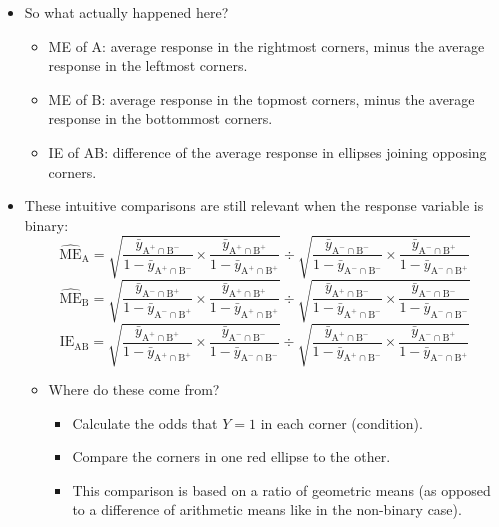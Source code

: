 \begin{itemize}
    \item So what actually happened here?
          \begin{itemize}
              \item ME of A\@: average response in the rightmost corners, minus the average response in the leftmost corners.
              \item ME of B\@: average response in the topmost corners, minus the average response in the bottommost corners.
              \item IE of AB\@: difference of the average response in ellipses joining opposing corners.
          \end{itemize}
    \item These intuitive comparisons are still relevant when the response variable is binary:
          \[ \widehat{\text{ME}}_{\text{A}}=\sqrt{\frac{\bar{y}_{\text{A}^+\cap \text{B}^-}}{1-\bar{y}_{\text{A}^+\cap \text{B}^-}}\times\frac{\bar{y}_{\text{A}^+\cap \text{B}^+}}{1-\bar{y}_{\text{A}^+\cap \text{B}^+}}}
              \div \sqrt{\frac{\bar{y}_{\text{A}^-\cap \text{B}^-}}{1-\bar{y}_{\text{A}^-\cap \text{B}^-}}\times\frac{\bar{y}_{\text{A}^-\cap \text{B}^+}}{1-\bar{y}_{\text{A}^-\cap \text{B}^+}}} \]
          \[ \widehat{\text{ME}}_{\text{B}}=\sqrt{\frac{\bar{y}_{\text{A}^-\cap \text{B}^+}}{1-\bar{y}_{\text{A}^-\cap \text{B}^+}}\times\frac{\bar{y}_{\text{A}^+\cap \text{B}^+}}{1-\bar{y}_{\text{A}^+\cap \text{B}^+}}}
              \div \sqrt{\frac{\bar{y}_{\text{A}^+\cap \text{B}^-}}{1-\bar{y}_{\text{A}^+\cap \text{B}^-}}\times\frac{\bar{y}_{\text{A}^-\cap \text{B}^-}}{1-\bar{y}_{\text{A}^-\cap \text{B}^-}}} \]
          \[ \widehat{\text{IE}}_{\text{AB}}=\sqrt{\frac{\bar{y}_{\text{A}^+\cap \text{B}^+}}{1-\bar{y}_{\text{A}^+\cap \text{B}^+}}\times\frac{\bar{y}_{\text{A}^-\cap \text{B}^-}}{1-\bar{y}_{\text{A}^-\cap \text{B}^-}}}
              \div \sqrt{\frac{\bar{y}_{\text{A}^+\cap \text{B}^-}}{1-\bar{y}_{\text{A}^+\cap \text{B}^-}}\times\frac{\bar{y}_{\text{A}^-\cap \text{B}^+}}{1-\bar{y}_{\text{A}^-\cap \text{B}^+}}} \]
          \begin{itemize}[$\hookrightarrow$]
              \item Where do these come from?
                    \begin{itemize}
                        \item Calculate the odds that $ Y=1 $ in each corner (condition).
                        \item Compare the corners in one red ellipse to the other.
                        \item This comparison is based on a ratio of geometric means (as opposed to a difference of arithmetic means like in the non-binary case).
                    \end{itemize}
          \end{itemize}
\end{itemize}
